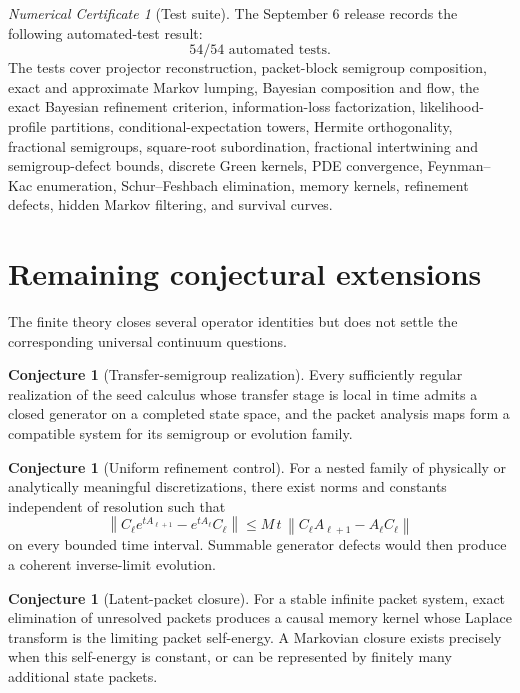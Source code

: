 \documentclass[11pt]{article}
\theoremstyle{definition}
\newtheorem{conjecture}[theorem]{Conjecture}
\theoremstyle{remark}
\newtheorem{certificate}[theorem]{Numerical Certificate}
\newcommand{\norm}[1]{\left\lVert#1\right\rVert}
\begin{document}
\begin{certificate}[Test suite]
The September 6 release records the following automated-test result:
\[
\boxed{54/54\text{ automated tests}.}
\]
The tests cover projector reconstruction, packet-block semigroup composition, exact and approximate Markov lumping, Bayesian composition and flow, the exact Bayesian refinement criterion, information-loss factorization, likelihood-profile partitions, conditional-expectation towers, Hermite orthogonality, fractional semigroups, square-root subordination, fractional intertwining and semigroup-defect bounds, discrete Green kernels, PDE convergence, Feynman--Kac enumeration, Schur--Feshbach elimination, memory kernels, refinement defects, hidden Markov filtering, and survival curves.
\end{certificate}

\section{Remaining conjectural extensions}

The finite theory closes several operator identities but does not settle the corresponding universal continuum questions.

\begin{conjecture}[Transfer-semigroup realization]
Every sufficiently regular realization of the seed calculus whose transfer stage is local in time admits a closed generator on a completed state space, and the packet analysis maps form a compatible system for its semigroup or evolution family.
\end{conjecture}

\begin{conjecture}[Uniform refinement control]
For a nested family of physically or analytically meaningful discretizations, there exist norms and constants independent of resolution such that
\[
\norm{C_\ell e^{tA_{\ell+1}}-e^{tA_\ell}C_\ell}
\le
M\,t\,\norm{C_\ell A_{\ell+1}-A_\ell C_\ell}
\]
on every bounded time interval. Summable generator defects would then produce a coherent inverse-limit evolution.
\end{conjecture}

\begin{conjecture}[Latent-packet closure]
For a stable infinite packet system, exact elimination of unresolved packets produces a causal memory kernel whose Laplace transform is the limiting packet self-energy. A Markovian closure exists precisely when this self-energy is constant, or can be represented by finitely many additional state packets.
\end{conjecture}
\end{document}
